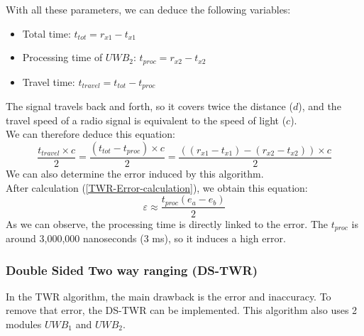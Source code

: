 With all these parameters, we can deduce the following variables:
\begin{itemize}
    \item Total time: $t_{tot} = r_{x1} - t_{x1}$
    \item Processing time of $UWB_2$: $t_{proc} = r_{x2} - t_{x2}$
    \item Travel time: $t_{travel} = t_{tot} - t_{proc}$
\end{itemize}
The signal travels back and forth, so it covers twice the distance ($d$), and the travel speed of a radio signal is equivalent to the speed of light ($c$). \\ 
We can therefore deduce this equation: 
\begin{equation} \label{TWR_eq}
\boxed{\frac{t_{travel}\times c}{2}=\frac{(t_{tot} - t_{proc}) \times c}{2}= \frac{((r_{x1} - t_{x1}) - (r_{x2} - t_{x2})) \times c}{2}}
\end{equation}
We can also determine the error induced by this algorithm.\\
After calculation (\ref{TWR-Error-calculation}), we obtain this equation: 
\begin{equation}
\varepsilon \approx \frac{t_ {proc}(e_a - e_b)}{2}
\end{equation}
As we can observe, the processing time is directly linked to the error. The $t_{proc}$ is around 3,000,000 nanoseconds (3 ms), so it induces a high error.

\subsubsection{Double Sided Two way ranging (DS-TWR)}
\label{DS-TWR}
In the TWR algorithm, the main drawback is the error and inaccuracy.
To remove that error, the DS-TWR can be implemented. This algorithm also uses 2 modules $UWB_1$ and $UWB_2$.

